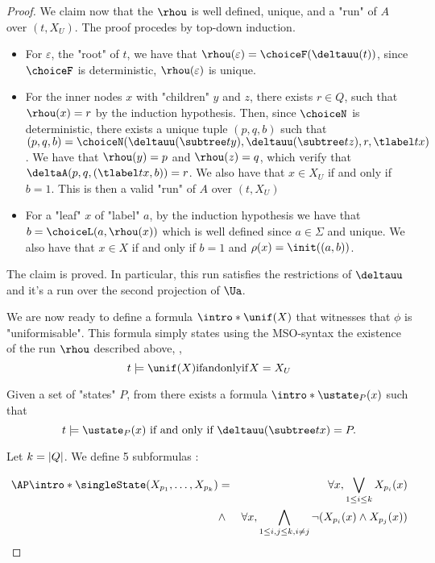 \documentclass[a4paper,UKenglish,cleveref, autoref, thm-restate]{lipics-v2021}
\begin{document}
\begin{proof}
	We claim now that the $\rhou$ is well defined, unique, and a "run" of $A$ over $(t,X_U)$. The proof procedes by top-down induction.
	\begin{itemize}
		\item For $\varepsilon$, the "root" of $t$, we have that $\rhou(\varepsilon) = \choiceF(\deltauu(t))$, since $\choiceF$ is deterministic, $\rhou(\varepsilon)$ is unique.
		\item For the inner nodes $x$ with "children" $y$ and $z$, there exists $r \in Q$, such that $\rhou (x) = r$ by the induction hypothesis. Then,
		      since $\choiceN$ is deterministic, there exists a unique tuple $(p,q,b)$ such that
		      $(p,q,b) = \choiceN(\deltauu(\subtree t y), \deltauu(\subtree t z), r, \tlabel t x)$.
		      We have that $\rhou(y) = p$ and $\rhou(z) = q$, which verify that $\deltaA(p,q,(\tlabel t x,b)) = r$. We also have that $x \in X_U$ if and only if $b = 1$.
		      This is then a valid "run" of $A$ over $(t,X_U)$
		\item For a "leaf" $x$ of "label" $a$, by the induction hypothesis we have that $b = \choiceL(a, \rhou(x))$ which is well defined since $a \in \Sigma$ and unique.
		      We also have that $x \in X$ if and only if $b = 1$ and $\rho(x) = \init ((a,b))$.
	\end{itemize}
	The claim is proved. In particular, this run satisfies the restrictions of $\deltauu$ and it's a run over the second projection of $\Ua$.

	\AP We are now ready to define a formula $\intro*\unif (X)$ that witnesses that $\phi$ is "uniformisable".
	This formula simply states using the MSO-syntax the existence of the run $\rhou$ described above, \ie,
	\[  t \models \unif(X)  \tiff X=X_U \]

	\AP Given a set of "states" $P$, from  there exists a formula $\intro* \ustate_P(x)$ such that
	\[ t \models \ustate_P(x) \text{ if and only if } \deltauu(\subtree t x) = P .\]


	Let $k = \left|Q\right|$.
	We define 5 subformulas :

	\begin{eqnarray*}
		\AP \intro* \singleState (X_{p_1}, \ldots, X_{p_k})  &=& \forall x, \bigvee_{1 \leq i \leq k} X_{p_i} (x)\\
		&\land& \forall x, \bigwedge_{1 \leq i, j \leq k, i \neq j} \lnot(X_{p_i} (x) \land X_{p_j}(x))
	\end{eqnarray*}


\end{proof}
\end{document}
